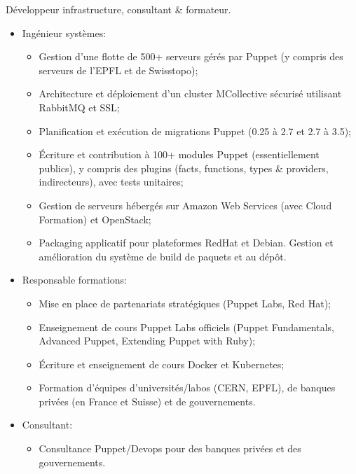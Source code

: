 \documentclass[11pt,a4paper]{moderncv}
\begin{document}
%
  {Développeur infrastructure, consultant \& formateur.
\begin{itemize}
  \item Ingénieur systèmes:
    \begin{itemize}
      \item Gestion d'une flotte de 500+ serveurs gérés par Puppet (y compris des serveurs de l'EPFL et de Swisstopo);
      \item Architecture et déploiement d'un cluster MCollective sécurisé utilisant RabbitMQ et SSL;
      \item Planification et exécution de migrations Puppet (0.25 à 2.7 et 2.7 à 3.5);
      \item Écriture et contribution à 100+ modules Puppet (essentiellement publics), y compris des plugins (facts, functions, types \& providers, indirecteurs), avec tests unitaires;
      \item Gestion de serveurs hébergés sur Amazon Web Services (avec Cloud Formation) et OpenStack;
      \item Packaging applicatif pour plateformes RedHat et Debian. Gestion et amélioration du système de build de paquets et au dépôt.
    \end{itemize}
  \item Responsable formations:
    \begin{itemize}
      \item Mise en place de partenariats stratégiques (Puppet Labs, Red Hat);
      \item Enseignement de cours Puppet Labs officiels (Puppet Fundamentals, Advanced Puppet, Extending Puppet with Ruby);
      \item Écriture et enseignement de cours Docker et Kubernetes;
      \item Formation d'équipes d'universités/labos (CERN, EPFL), de banques privées (en France et Suisse) et de gouvernements.
    \end{itemize}
  \item Consultant:
    \begin{itemize}
      \item Consultance Puppet/Devops pour des banques privées et des gouvernements.
    \end{itemize}
\end{itemize}}
\end{document}
